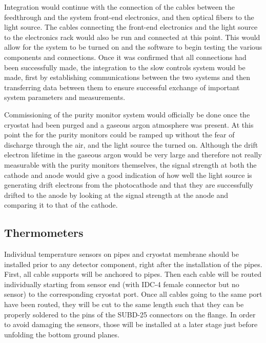 Integration would continue with the connection of the  cables between the feedthrough and the system front-end electronics, and then optical fibers to the light source.  The cables connecting the front-end electronics and the light source to the electronics rack would also be run and connected at this point.  This would allow for the system to be turned on and the software to begin testing the various components and connections.  Once it was confirmed that all connections had been successfully made, the integration to the slow controls system would be made, first by establishing communications between the two systems and then transferring data between them to ensure successful exchange of important system parameters and measurements.  

Commissioning of the purity monitor system would officially be done once the cryostat had been purged and a gaseous argon atmosphere was present.  At this point the  for the purity monitors could be ramped up without the fear of discharge through the air, and the light source the turned on.  Although the drift electron lifetime in the gaseous argon would be very large and therefore not really measurable with the purity monitors themselves, the signal strength at both the cathode and anode would give a good indication of how well the light source is generating drift electrons from the photocathode and that they are successfully drifted to the anode by looking at the signal strength at the anode and comparing it to that of the cathode.


\subsection{Thermometers}
\label{sec:fdgen-slow-cryo-instal-th}


Individual temperature sensors on pipes and cryostat membrane should be installed prior to any detector component, right after the installation of the pipes.
First, all cable supports will be anchored to pipes. Then each cable will be routed individually starting from sensor end (with IDC-4 female connector but no sensor)
to the corresponding cryostat port. Once all cables going to the same port have been routed, they will be cut to the same length such that they can be properly soldered
to the pins of the SUBD-25 connectors on the flange. In order to avoid damaging the sensors, those will be installed at a later stage just before unfolding the bottom ground planes.

